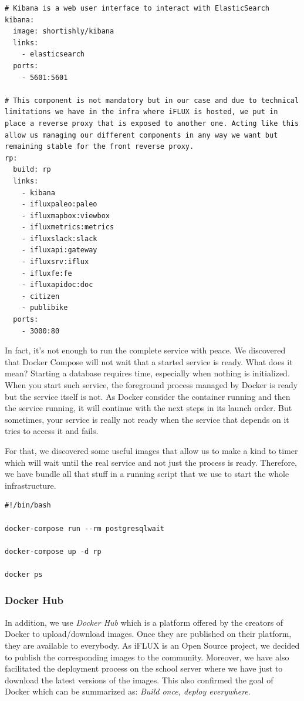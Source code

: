 \begin{lstlisting}
# Kibana is a web user interface to interact with ElasticSearch
kibana:
  image: shortishly/kibana
  links:
    - elasticsearch
  ports:
    - 5601:5601

# This component is not mandatory but in our case and due to technical limitations we have in the infra where iFLUX is hosted, we put in place a reverse proxy that is exposed to another one. Acting like this allow us managing our different components in any way we want but remaining stable for the front reverse proxy.
rp:
  build: rp
  links:
    - kibana
    - ifluxpaleo:paleo
    - ifluxmapbox:viewbox
    - ifluxmetrics:metrics
    - ifluxslack:slack
    - ifluxapi:gateway
    - ifluxsrv:iflux
    - ifluxfe:fe
    - ifluxapidoc:doc
    - citizen
    - publibike
  ports:
    - 3000:80
\end{lstlisting}

In fact, it's not enough to run the complete service with peace. We discovered that Docker Compose will not wait that a started service is ready. What does it mean? Starting a database requires time, especially when nothing is initialized. When you start such service, the foreground process managed by Docker is ready but the service itself is not. As Docker consider the container running and then the service running, it will continue with the next steps in its launch order. But sometimes, your service is really not ready when the service that depends on it tries to access it and fails.

For that, we discovered some useful images that allow us to make a kind to timer which will wait until the real service and not just the process is ready. Therefore, we have bundle all that stuff in a running script that we use to start the whole infrastructure.

\begin{lstlisting}
#!/bin/bash

docker-compose run --rm postgresqlwait

docker-compose up -d rp

docker ps
\end{lstlisting}

\subsubsection{Docker Hub}

In addition, we use \emph{Docker Hub} which is a platform offered by the creators of Docker to upload/download images. Once they are published on their platform, they are available to everybody. As iFLUX is an Open Source project, we decided to publish the corresponding images to the community. Moreover, we have also facilitated the deployment process on the school server where we have just to download the latest versions of the images. This also confirmed the goal of Docker which can be summarized as: \emph{Build once, deploy everywhere}.


